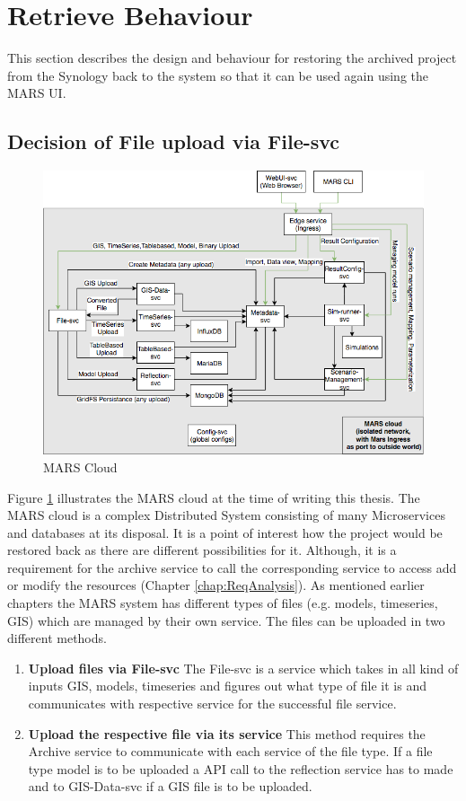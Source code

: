 \section{Retrieve Behaviour}
This section describes the design and behaviour for restoring the archived project from the Synology back to the system
so that it can be used again using the MARS UI.   

\subsection{Decision of File upload via File-svc}

\begin{figure}[H]
    \centering \includegraphics[scale=0.45]{grafiken/mars-cloud.png}
    \caption{MARS Cloud \cite{MARSCLoud}}
    \label{fig:MARSCloud}
\end{figure}

Figure \ref{fig:MARSCloud} illustrates the MARS cloud at the time of writing this thesis. The MARS cloud is a complex Distributed System consisting of many 
Microservices and databases at its disposal. It is a point of interest how the project would be restored back as there are different possibilities for it. 
Although, it is a requirement for the archive service
to call the corresponding service to access add or modify the resources (Chapter \ref{chap:ReqAnalysis}). As mentioned earlier chapters the MARS system
has different types of files (e.g. models, timeseries, GIS) which are managed by their own service. The files can be uploaded in two different methods.
\begin{enumerate}
 \item \textbf{Upload files via File-svc} The File-svc is a service which takes in all kind of inputs GIS, models, timeseries and figures out what type of
    file it is and communicates with respective service for the successful file service. 
 \item \textbf{Upload the respective file via its service} This method requires the Archive service to communicate with each service of the file type. If a file type
 model is to be uploaded a API call to the reflection service has to made and to GIS-Data-svc if a GIS file is to be uploaded.
\end{enumerate} 

